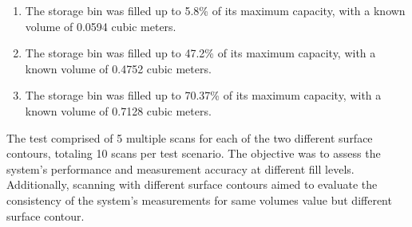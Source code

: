 
\begin{enumerate}
	\item The storage bin was filled up to 5.8\% of its maximum capacity, with a known volume of 0.0594 cubic meters.
	\item The storage bin was filled up to 47.2\% of its maximum capacity, with a known volume of 0.4752 cubic meters.
	\item The storage bin was filled up to 70.37\% of its maximum capacity, with a known volume of 0.7128 cubic meters.
\end{enumerate}

The test comprised of 5 multiple scans for each of the two different surface contours, totaling 10 scans per test scenario. The objective was to assess the system's performance and measurement accuracy at different fill levels. Additionally, scanning with different surface contours aimed to evaluate the consistency of the system's measurements for same volumes value but different surface contour.




